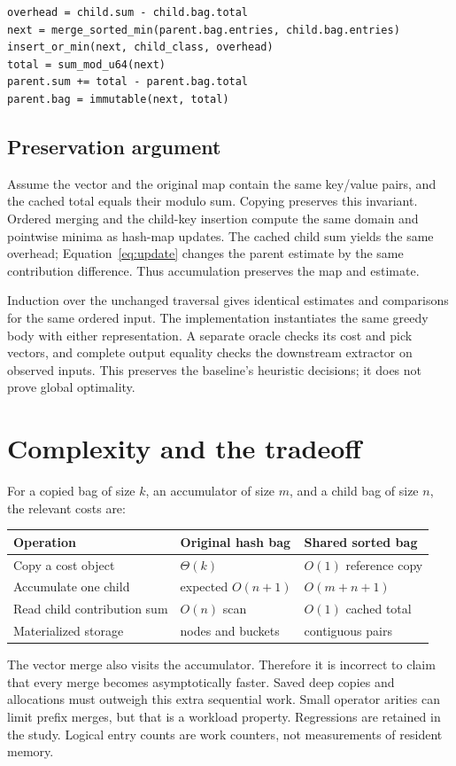 \documentclass[10pt,a4paper]{article}
\begin{document}
\begin{lstlisting}[caption={Representation-level accumulation (schematic).}]
overhead = child.sum - child.bag.total
next = merge_sorted_min(parent.bag.entries, child.bag.entries)
insert_or_min(next, child_class, overhead)
total = sum_mod_u64(next)
parent.sum += total - parent.bag.total
parent.bag = immutable(next, total)
\end{lstlisting}

\subsection{Preservation argument}
Assume the vector and the original map contain the same key/value pairs, and the
cached total equals their modulo sum. Copying preserves this invariant.
Ordered merging and the child-key insertion compute the same domain and
pointwise minima as hash-map updates. The cached child sum yields the same
overhead; Equation~\ref{eq:update} changes the parent estimate by the same
contribution difference. Thus accumulation preserves the map and estimate.

Induction over the unchanged traversal gives identical estimates and comparisons
for the same ordered input. The implementation instantiates the same greedy body
with either representation. A separate oracle checks its cost and pick vectors,
and complete output equality checks the downstream extractor on observed inputs.
This preserves the baseline's heuristic decisions; it does not prove global
optimality.

\section{Complexity and the tradeoff}
For a copied bag of size $k$, an accumulator of size $m$, and a child bag of
size $n$, the relevant costs are:
\begin{center}
\begin{tabular}{lll}
\toprule
Operation & Original hash bag & Shared sorted bag\\
\midrule
Copy a cost object & $\Theta(k)$ & $O(1)$ reference copy\\
Accumulate one child & expected $O(n+1)$ & $O(m+n+1)$\\
Read child contribution sum & $O(n)$ scan & $O(1)$ cached total\\
Materialized storage & nodes and buckets & contiguous pairs\\
\bottomrule
\end{tabular}
\end{center}
The vector merge also visits the accumulator. Therefore it is incorrect to claim
that every merge becomes asymptotically faster. Saved deep copies and allocations
must outweigh this extra sequential work. Small operator arities can limit prefix
merges, but that is a workload property. Regressions are retained in the study.
Logical entry counts are work counters, not measurements of resident memory.
\end{document}
